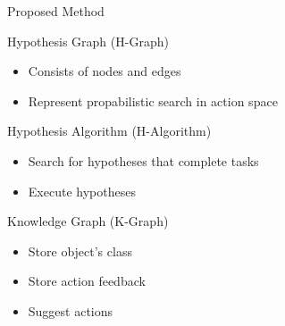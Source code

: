 \begin{frame}[fragile]{Proposed Method} 
\begin{block}{Hypothesis Graph (H-Graph)}
    \begin{itemize}
      \item Consists of nodes and edges
      \item Represent propabilistic search in action space
    \end{itemize}
  \end{block}\pause

\begin{block}{Hypothesis Algorithm (H-Algorithm)}
    \begin{itemize}
      \item Search for hypotheses that complete tasks
      \item Execute hypotheses
    \end{itemize}
  \end{block}\pause

\begin{block}{Knowledge Graph (K-Graph)}
    \begin{itemize}
      \item Store object's class
      \item Store action feedback
      \item Suggest actions
    \end{itemize}
  \end{block}
\end{frame}

